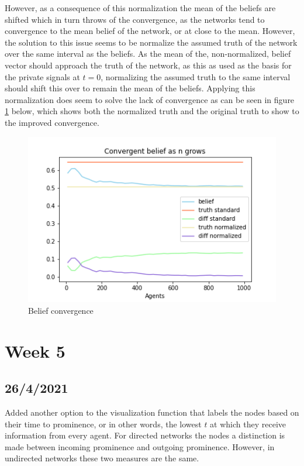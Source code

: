 \documentclass{article}
\begin{document}
However, as a consequence of this normalization the mean of the beliefs are shifted which in turn throws of the convergence, as the networks tend to convergence to the mean belief of the network, or at close to the mean.
However, the solution to this issue seems to be normalize the assumed truth of the network over the same interval as the beliefs. As the mean of the, non-normalized, belief vector should approach the truth of the network, as this as used as the basis for the private signals at $t=0$, normalizing the assumed truth to the same interval should shift this over to remain the mean of the beliefs. Applying this normalization does seem to solve the lack of convergence as can be seen in figure \ref{wisdom:norm} below, which shows both the normalized truth and the original truth to show to the improved convergence.
\begin{center}
    \begin{figure}[!htbp]
        \centering
        \includegraphics[width=.7\textwidth]{ThesisKI/Images/WisdomConvergenceBoth.png}
        \caption{Belief convergence}
        \label{wisdom:norm}
    \end{figure}
\end{center}

\newpage

\section{Week 5}

\subsection{26/4/2021}

Added another option to the visualization function that labels the nodes based on their time to prominence, or in other words, the lowest $t$ at which they receive information from every agent. For directed networks the nodes a distinction is made between incoming prominence and outgoing prominence. However, in undirected networks these two measures are the same.
\end{document}
